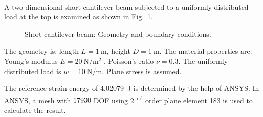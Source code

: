 \paragraph{}
A two-dimensional short cantilever beam subjected to a uniformly distributed load at the top is examined as shown
in Fig.~\ref{adp_fig:ex_cantilever_beam_geo_bc}.
    \begin{figure}[h!]
    \centering
        \caption{ Short cantilever beam: Geometry and boundary conditions.}
        \label{adp_fig:ex_cantilever_beam_geo_bc}
    \end{figure}

The geometry is: length $L = \SI{1}{\meter} $, height $ D = \SI{1}{\meter} $.
The material properties are: Young’s modulus $ E = \SI{20}{\newton \per \meter^2} $ , Poisson’s ratio $ \nu =0.3 $.
The uniformly distributed load is $w = \SI{10}{\newton \per \meter} $.
Plane stress is assumed.

The reference strain energy of \SI{4.02079}{\joule} is determined by the help of ANSYS.
In ANSYS, a mesh with $17930$ DOF using 2 \textsuperscript{nd} order plane element 183 is used to calculate the result.

